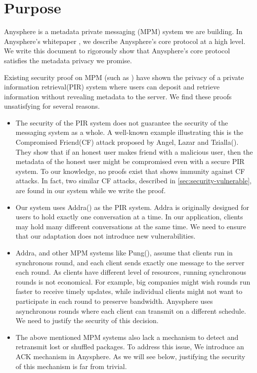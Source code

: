 \section{Purpose}
\label{sec:purpose}
Anysphere is a metadata private messaging (MPM) system we are building. In Anysphere's whitepaper \cite[Section 3]{whitepaper}, we describe Anysphere's core protocol at a high level. We write this document to rigorously show that Anysphere's core protocol satisfies the metadata privacy we promise.

Existing security proof on MPM (such as \cite{corrigan2010dissent, corrigan2015riposte, angel2016unobservable, ahmad2021addra}) have shown the privacy of a private information retrieval(PIR) system where users can deposit and retrieve information without revealing metadata to the server. We find these proofs unsatisfying for several reasons.
\begin{itemize}
    \item The security of the PIR system does not guarantee the security of the messaging system as a whole. A well-known example illustrating this is the Compromised Friend(CF) attack proposed by Angel, Lazar and Tzialla(\cite{angel2018cf}). They show that if an honest user makes friend with a malicious user, then the metadata of the honest user might be compromised even with a secure PIR system. To our knowledge, no proofs exist that shows immunity against CF attacks. In fact, two similar CF attacks, described in \cref{sec:security-vulnerable}, are found in our system while we write the proof.
    
    \item Our system uses Addra(\cite{ahmad2021addra}) as the PIR system. Addra is originally designed for users to hold exactly one conversation at a time. In our application, clients may hold many different conversations at the same time. We need to ensure that our adaptation does not introduce new vulnerabilities.
    
    \item Addra, and other MPM systems like Pung(\cite{angel2016unobservable}), assume that clients run in synchronous round, and each client sends exactly one message to the server each round. As clients have different level of resources, running synchronous rounds is not economical. For example, big companies might wish rounds run faster to receive timely updates, while individual clients might not want to participate in each round to preserve bandwidth. Anysphere uses asynchronous rounds where each client can transmit on a different schedule. We need to justify the security of this decision.
    
    \item The above mentioned MPM systems also lack a mechanism to detect and retransmit lost or shuffled packages. To address this issue, We introduce an ACK mechanism in Anysphere. As we will see below, justifying the security of this mechanism is far from trivial.
\end{itemize}

